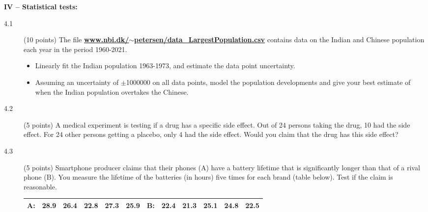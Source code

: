 \documentclass[11pt]{article}
\begin{document}
\noindent
{\bf IV -- Statistical tests:}
\vspace*{-1ex}
\begin{description}
\item[4.1] (10 points)
  The file \href{http://www.nbi.dk/~petersen/data\_LargestPopulation.csv}{\bf www.nbi.dk/$\sim$petersen/data\_LargestPopulation.csv}
  contains data on the Indian and Chinese population each year in the period 1960-2021.
  \vspace*{-1ex}
  \begin{itemize}
    \item Linearly fit the Indian population 1963-1973, and estimate the data point uncertainty.
    \item Assuming an uncertainty of $\pm$1000000 on all data points, model the population developments
      and give your best estimate of when the Indian population overtakes the Chinese.
  \end{itemize}
%
\item[4.2] (5 points)
  A medical experiment is testing if a drug has a specific side effect. Out of 24 persons taking the drug,
  10 had the side effect. For 24 other persons getting a placebo, only 4 had the side effect. Would you
  claim that the drug has this side effect?
%
\item[4.3] (5 points)
  Smartphone producer claims that their phones (A) have a battery lifetime that is significantly longer than that of a
  rival phone (B). You measure the lifetime of the batteries (in hours) five times for each brand (table below).
  Test if the claim is reasonable.\\[-4ex]
  \begin{center}
  \begin{tabular}{|lccccc|lccccc|}
    \hline
      A:   &28.9  &26.4  &22.8  &27.3  &25.9  &B:   &22.4  &21.3  &25.1  &24.8  &22.5\\
    \hline
  \end{tabular}
  \end{center}

\end{description}


\end{document}
